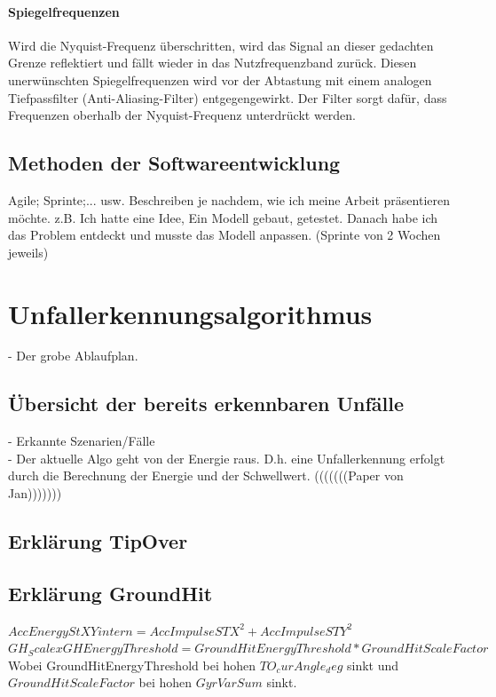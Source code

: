 \subsubsection{Spiegelfrequenzen}
Wird die Nyquist-Frequenz überschritten, wird das Signal an dieser gedachten Grenze reflektiert und fällt wieder in das Nutzfrequenzband zurück. Diesen unerwünschten Spiegelfrequenzen wird vor der Abtastung mit einem analogen Tiefpassfilter (Anti-Aliasing-Filter) entgegengewirkt. Der Filter sorgt dafür, dass Frequenzen oberhalb der Nyquist-Frequenz unterdrückt werden.






%
%
%
%
%
%
%



\section{Methoden der Softwareentwicklung}
Agile; Sprinte;... usw.
Beschreiben je nachdem, wie ich meine Arbeit präsentieren möchte.
z.B. Ich hatte eine Idee,  Ein Modell gebaut, getestet. Danach habe ich das Problem entdeckt und musste das Modell anpassen. (Sprinte von 2 Wochen jeweils)

%
%
%
%
%
%
%
\chapter{Unfallerkennungsalgorithmus}
%
%
%
%
- Der grobe Ablaufplan.\\

\section{Übersicht der bereits erkennbaren Unfälle}

- Erkannte Szenarien/Fälle\\

- Der aktuelle Algo geht von der Energie raus. D.h. eine Unfallerkennung erfolgt durch die Berechnung der Energie und der Schwellwert. (((((((Paper von Jan)))))))
\section{Erklärung TipOver}
%
%
%
%


\section{Erklärung GroundHit}
%
%
%
%
$AccEnergyStXYintern = AccImpulseSTX^2+ AccImpulseSTY^2$\\
$GH_ScalexGHEnergyThreshold = GroundHitEnergyThreshold * GroundHitScaleFactor$\\
Wobei GroundHitEnergyThreshold bei hohen $TO_curAngle_deg$ sinkt und $GroundHitScaleFactor$ bei hohen $GyrVarSum$ sinkt.


